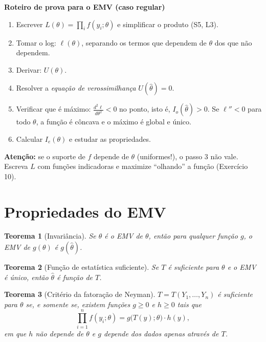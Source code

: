 \documentclass[11pt,a4paper]{article}
\theoremstyle{definition}
\theoremstyle{plain}
\newtheorem{teorema}{Teorema}[section]
\begin{document}
\begin{mdframed}[linecolor=Gray,backgroundcolor=Gray!5]
\textbf{Roteiro de prova para o EMV (caso regular)}
\begin{enumerate}[label=\arabic*.]
\item Escrever $L(\theta)=\prod_if(y_i;\theta)$ e simplificar o produto (S5, L3).
\item Tomar o log: $\ell(\theta)$, separando os termos que dependem de $\theta$ dos que não dependem.
\item Derivar: $U(\theta)$.
\item Resolver a \emph{equação de verossimilhança} $U(\hat\theta)=0$.
\item Verificar que é máximo: $\frac{d^2\ell}{d\theta^2}<0$ no ponto, isto é, $I_o(\hat\theta)>0$. Se $\ell''<0$ para todo $\theta$, a função é côncava e o máximo é global e único.
\item Calcular $I_e(\theta)$ e estudar as propriedades.
\end{enumerate}
\textbf{Atenção:} se o suporte de $f$ depende de $\theta$ (uniformes!), o passo 3 não vale. Escreva $L$ com funções indicadoras e maximize ``olhando'' a função (Exercício 10).
\end{mdframed}

\section{Propriedades do EMV}

\begin{teorema}[Invariância]
Se $\hat\theta$ é o EMV de $\theta$, então para qualquer função $g$, o EMV de $g(\theta)$ é $g(\hat\theta)$.
\end{teorema}

\begin{teorema}[Função de estatística suficiente]
Se $T$ é suficiente para $\theta$ e o EMV é único, então $\hat\theta$ é função de $T$.
\end{teorema}

\begin{teorema}[Critério da fatoração de Neyman]
$T=T(Y_1,\dots,Y_n)$ é suficiente para $\theta$ se, e somente se, existem funções $g\ge0$ e $h\ge0$ tais que
\[
\prod_{i=1}^nf(y_i;\theta)=g\big(T(y);\theta\big)\cdot h(y),
\]
em que $h$ não depende de $\theta$ e $g$ depende dos dados apenas através de $T$.
\end{teorema}
\end{document}
